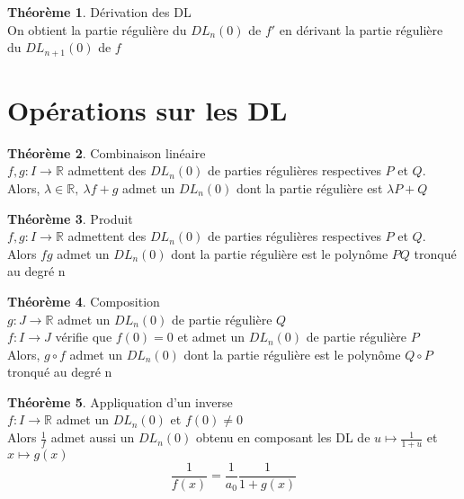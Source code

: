 \documentclass[fleqn]{article}
\theoremstyle{definition} \newtheorem*{defi}{D\'efinition}
\theoremstyle{definition} \newtheorem*{theo}{Th\'eor\`eme}
\theoremstyle{definition} \newtheorem*{prop}{Propri\'et\'e}
\theoremstyle{definition} \newtheorem*{coro}{Corollaire}
\theoremstyle{remark} \newtheorem*{rqs}{Remarques}
\begin{document}
\begin{theo} D\'erivation des DL \\
	On obtient la partie r\'eguli\`ere du $DL_n(0)$ de $f'$ en d\'erivant la partie r\'eguli\`ere du $DL_{n+1}(0)$ de $f$
\end{theo}

\section{Op\'erations sur les DL}
\begin{theo} Combinaison lin\'eaire\\
	$f,g: I \rightarrow \mathbb{R}$ admettent des $DL_n(0)$ de parties r\'eguli\`eres respectives $P$ et $Q$. \\
	Alors, $\lambda \in \mathbb{R},\ \lambda f + g$ admet un $DL_n(0)$ dont la partie r\'eguli\`ere est $\lambda P + Q$
\end{theo}

\begin{theo} Produit \\
	$f,g: I \rightarrow \mathbb{R}$ admettent des $DL_n(0)$ de parties r\'eguli\`eres respectives $P$ et $Q$. \\
	Alors $fg$ admet un $DL_n(0)$ dont la partie r\'eguli\`ere est le polyn\^ome $PQ$ tronqu\'e au degr\'e n
\end{theo}

\begin{theo} Composition \\
	$g: J \rightarrow \mathbb{R}$ admet un $DL_n(0)$ de partie r\'eguli\`ere $Q$ \\
	$f: I \rightarrow J$ v\'erifie que $f(0) = 0$ et admet un $DL_n(0)$ de partie r\'eguli\`ere $P$ \\
	Alors, $g \circ f$ admet un $DL_n(0)$ dont la partie r\'eguli\`ere est le polyn\^ome $Q \circ P$ tronqu\'e au degr\'e n
\end{theo}

\begin{theo} Appliquation d'un inverse \\
	$f: I \rightarrow \mathbb{R}$ admet un $DL_n(0)$ et $f(0) \neq 0$ \\
	Alors $\frac{1}{f}$ admet aussi un $DL_n(0)$ obtenu en composant les DL de $u \mapsto \frac{1}{1+u}$ et $x \mapsto g(x)$
	\[\frac{1}{f(x)} = \frac{1}{a_0} \frac{1}{1 + g(x)}\]
\end{theo}
\end{document}
